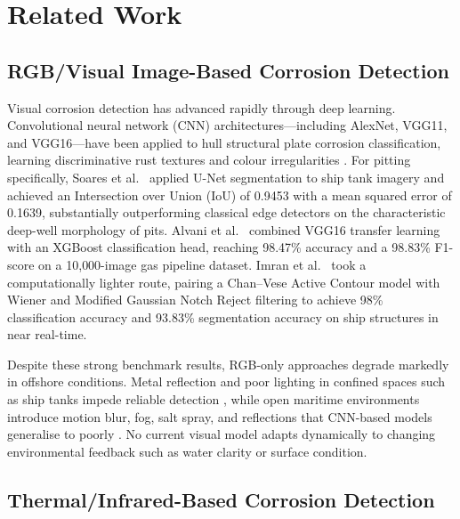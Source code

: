 \section{Related Work}

\subsection{RGB/Visual Image-Based Corrosion Detection}

Visual corrosion detection has advanced rapidly through deep learning. Convolutional neural network (CNN) architectures—including AlexNet, VGG11, and VGG16—have been applied to hull structural plate corrosion classification, learning discriminative rust textures and colour irregularities \cite{yao2019artificial}. For pitting specifically, Soares et al.\ \cite{soares2023autonomous} applied U-Net segmentation to ship tank imagery and achieved an Intersection over Union (IoU) of 0.9453 with a mean squared error of 0.1639, substantially outperforming classical edge detectors on the characteristic deep-well morphology of pits. Alvani et al.\ \cite{alvani2026corrosion} combined VGG16 transfer learning with an XGBoost classification head, reaching 98.47\% accuracy and a 98.83\% F1-score on a 10{,}000-image gas pipeline dataset. Imran et al.\ \cite{imran2025ship} took a computationally lighter route, pairing a Chan--Vese Active Contour model with Wiener and Modified Gaussian Notch Reject filtering to achieve 98\% classification accuracy and 93.83\% segmentation accuracy on ship structures in near real-time.

Despite these strong benchmark results, RGB-only approaches degrade markedly in offshore conditions. Metal reflection and poor lighting in confined spaces such as ship tanks impede reliable detection \cite{soares2023autonomous}, while open maritime environments introduce motion blur, fog, salt spray, and reflections that CNN-based models generalise to poorly \cite{imran2025ship, yao2019artificial}. No current visual model adapts dynamically to changing environmental feedback such as water clarity or surface condition.

\subsection{Thermal/Infrared-Based Corrosion Detection}

